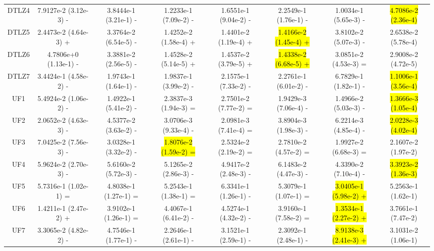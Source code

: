\documentclass[journal]{IEEEtran}
\begin{document}
\begin{table}[tbp]
{\begin{tabular}{cccccccc}
      DTLZ4   & 7.9127e-2 (3.12e-3) -      & 3.8444e-1 (3.21e-1) -      & 1.2233e-1 (7.09e-2) -      & 1.6551e-1 (9.04e-2) -      & 2.2549e-1 (1.76e-1) -      & 1.0034e-1 (5.65e-3) -      & \hl{4.7086e-2 (2.36e-4)} \\
      DTLZ5   & 2.4473e-2 (4.64e-3) +      & 3.3764e-2 (6.54e-5) -      & 1.4252e-2 (1.58e-4) +      & 1.4401e-2 (1.19e-4) +      & \hl{1.4166e-2 (1.45e-4) +} & 3.8102e-2 (5.07e-3) -      & 2.6538e-2 (5.78e-4)      \\
      DTLZ6   & 4.7806e+0 (1.13e-1) -      & 3.3881e-2 (2.56e-5) -      & 1.4528e-2 (5.14e-5) +      & 1.4537e-2 (3.79e-5) +      & \hl{1.4338e-2 (6.68e-5) +} & 3.0851e-2 (4.53e-3) =      & 2.9008e-2 (4.72e-5)      \\
      DTLZ7   & 3.4424e-1 (4.58e-2) -      & 1.9743e-1 (1.64e-1) -      & 1.9837e-1 (3.99e-2) -      & 2.1575e-1 (7.33e-2) -      & 2.2761e-1 (6.01e-2) -      & 6.7829e-1 (1.82e-1) -      & \hl{1.1006e-1 (3.56e-4)} \\
      \hline
      UF1     & 5.4924e-2 (1.06e-2) -      & 1.4922e-1 (5.41e-2) -      & 2.3837e-3 (1.94e-3) =      & 2.7501e-2 (7.77e-2) =      & 1.9429e-3 (7.06e-4) -      & 1.4966e-2 (5.03e-3) -      & \hl{1.3666e-3 (1.05e-4)} \\
      UF2     & 2.0652e-2 (4.63e-3) -      & 4.5377e-2 (3.63e-2) -      & 3.0706e-3 (9.33e-4) -      & 2.0981e-3 (7.41e-4) =      & 3.8904e-3 (1.98e-3) -      & 6.2214e-3 (4.85e-4) -      & \hl{2.0228e-3 (4.02e-4)} \\
      UF3     & 7.0425e-2 (7.56e-3) -      & 3.0328e-1 (3.32e-2) -      & \hl{1.8076e-2 (1.59e-2) =} & 2.5324e-2 (2.19e-2) =      & 2.7810e-2 (4.57e-2) =      & 1.9927e-2 (6.68e-3) =      & 2.1607e-2 (1.97e-2)      \\
      UF4     & 5.9624e-2 (2.70e-3) -      & 5.6160e-2 (5.72e-3) -      & 5.1265e-2 (2.86e-3) -      & 4.9417e-2 (2.48e-3) -      & 6.1483e-2 (4.47e-3) -      & 4.3390e-2 (7.10e-4) -      & \hl{3.3923e-2 (1.36e-3)} \\
      UF5     & 5.7316e-1 (1.02e-1) =      & 4.8038e-1 (1.27e-1) =      & 5.2543e-1 (1.38e-1) =      & 6.3341e-1 (1.26e-1) -      & 5.3079e-1 (1.07e-1) =      & \hl{3.0405e-1 (5.98e-2) +} & 5.2563e-1 (1.62e-1)      \\
      UF6     & 1.4211e-1 (2.47e-2) +      & 3.9102e-1 (1.26e-1) =      & 4.4067e-1 (6.41e-2) -      & 4.5274e-1 (4.32e-2) -      & 3.9160e-1 (7.58e-2) =      & \hl{1.3534e-1 (2.27e-2) +} & 3.7661e-1 (7.47e-2)      \\
      UF7     & 3.3065e-2 (4.82e-2) -      & 4.7546e-1 (1.77e-1) -      & 2.2646e-1 (2.61e-1) -      & 3.1521e-1 (2.59e-1) -      & 2.3092e-1 (2.48e-1) -      & \hl{8.9138e-3 (2.41e-3) +} & 3.1031e-2 (1.06e-1)      \\

\end{tabular}}
\end{table}
\end{document}
